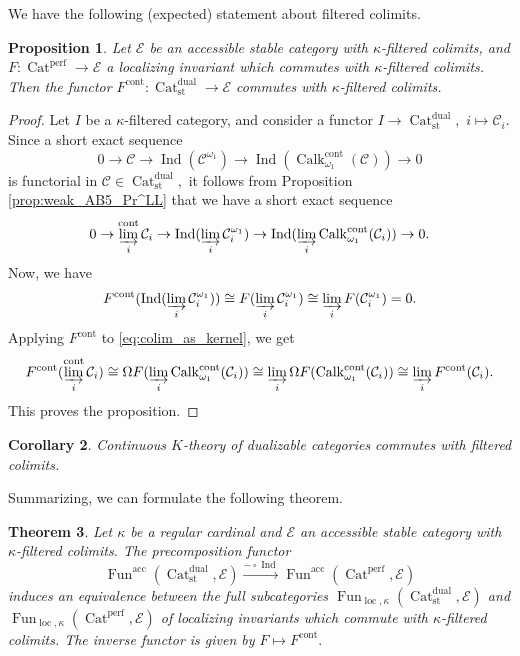 \documentclass[11pt,leqno]{amsart}
\newtheorem{theo}{Theorem}[section]
\newtheorem{prop}[theo]{Proposition}
\newtheorem{cor}[theo]{Corollary}
\numberwithin{equation}{section}
\newcommand{\indlim}[1][]{\mathop{\varinjlim}\limits_{#1}}
\newcommand{\liminj}{\varinjlim}
\newcommand{\xto}{\xrightarrow}
\newcommand{\Cat}{\operatorname{Cat}}
\newcommand{\loc}{\operatorname{loc}}
\newcommand{\cont}{\operatorname{cont}}
\newcommand{\acc}{\operatorname{acc}}
\newcommand{\st}{\operatorname{st}}
\newcommand{\dual}{\operatorname{dual}}
\newcommand{\cC}{{\mathcal C}}
\newcommand{\cE}{{\mathcal E}}
\newcommand{\Fun}{\operatorname{Fun}}
\newcommand{\perf}{\operatorname{perf}}
\newcommand{\Ind}{\operatorname{Ind}}
\newcommand{\Calk}{\operatorname{Calk}}
\begin{document}
We have the following (expected) statement about filtered colimits.

\begin{prop}\label{prop:F_cont_filtered_colimits} Let $\cE$ be an accessible stable category with $\kappa$-filtered colimits, and $F:\Cat^{\perf}\to\cE$ a localizing invariant which commutes with $\kappa$-filtered colimits. Then the functor $F^{\cont}:\Cat_{\st}^{\dual}\to \cE$ commutes with $\kappa$-filtered colimits.\end{prop}

\begin{proof}Let $I$ be a $\kappa$-filtered category, and consider a functor $I\to\Cat_{\st}^{\dual},$ $i\mapsto \cC_i.$ Since a short exact sequence
$$0\to \cC\to\Ind(\cC^{\omega_1})\to\Ind(\Calk^{\cont}_{\omega_1}(\cC))\to 0$$ is functorial in $\cC\in\Cat_{\st}^{\dual},$ it follows from Proposition \ref{prop:weak_AB5_Pr^LL} that we have a short exact sequence
\begin{equation}\label{eq:colim_as_kernel}0\to \liminj_i^{\cont}\cC_i\to\Ind(\liminj_i\cC_i^{\omega_1})\to\Ind(\liminj_i\Calk_{\omega_1}^{\cont}(\cC_i))\to 0.\end{equation}
Now, we have $$F^{\cont}(\Ind(\indlim[i]\cC_i^{\omega_1}))\cong F(\indlim[i]\cC_i^{\omega_1})\cong\liminj_iF(\cC_i^{\omega_1})=0.$$ Applying $F^{\cont}$ to \eqref{eq:colim_as_kernel}, we get $$F^{\cont}(\indlim[i]^{\cont}\cC_i)\cong \Omega F(\indlim[i]\Calk_{\omega_1}^{\cont}(\cC_i))\cong\indlim[i]\Omega F(\Calk_{\omega_1}^{\cont}(\cC_i))\cong\indlim[i]F^{\cont}(\cC_i).$$ This proves the proposition.\end{proof}

\begin{cor}Continuous $K$-theory of dualizable categories commutes with filtered colimits.\end{cor}

Summarizing, we can formulate the following theorem.

\begin{theo}\label{th:equivalence_between_localizing} Let $\kappa$ be a regular cardinal and $\cE$ an accessible stable category with $\kappa$-filtered colimits. The precomposition functor
$$\Fun^{\acc}(\Cat_{\st}^{\dual},\cE)\xto{-\circ\Ind}\Fun^{\acc}(\Cat^{\perf},\cE)$$
induces an equivalence between the full subcategories $\Fun_{\loc,\kappa}(\Cat_{\st}^{\dual},\cE)$ and $\Fun_{\loc,\kappa}(\Cat^{\perf},\cE)$ of localizing invariants which commute with $\kappa$-filtered colimits. The inverse functor is given by $F\mapsto F^{\cont}.$\end{theo}
\end{document}
